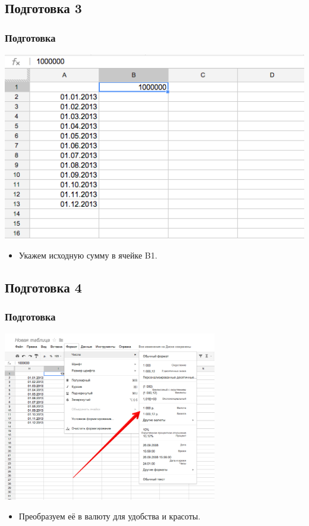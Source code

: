\documentclass[compress,red]{beamer}
\begin{document}
\subsection{Подготовка 3}
\begin{frame}[fragile]
  \frametitle{Подготовка}
  \centerline{\includegraphics[width=1.0\textwidth]{images/14.png}}
  \begin{itemize}
    \item Укажем исходную сумму в ячейке B1.
  \end{itemize}
\end{frame}

\subsection{Подготовка 4}
\begin{frame}[fragile]
  \frametitle{Подготовка}
  \centerline{\includegraphics[width=0.7\textwidth]{images/15.png}}
  \begin{itemize}
    \item Преобразуем её в валюту для удобства и красоты.
  \end{itemize}
\end{frame}
\end{document}
